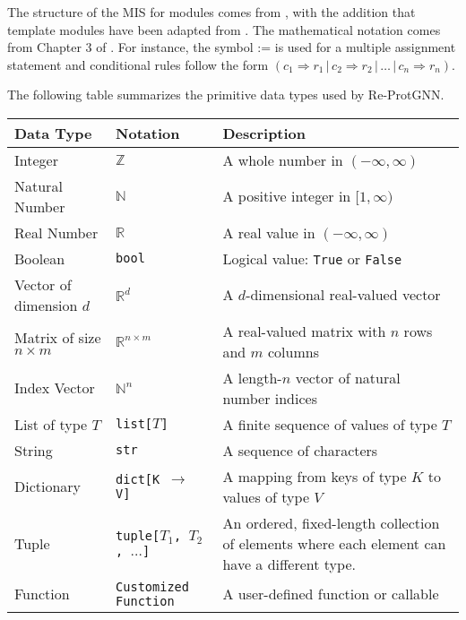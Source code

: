 \documentclass[12pt, titlepage]{article}
\begin{document}
The structure of the MIS for modules comes from \citet{HoffmanAndStrooper1995},
with the addition that template modules have been adapted from
\citet{GhezziEtAl2003}.  The mathematical notation comes from Chapter 3 of
\citet{HoffmanAndStrooper1995}.  For instance, the symbol := is used for a
multiple assignment statement and conditional rules follow the form $(c_1
\Rightarrow r_1 \,|\, c_2 \Rightarrow r_2 \,|\, \dots \,|\, c_n \Rightarrow r_n)$.

\vspace{1em}

The following table summarizes the primitive data types used by Re-ProtGNN. 

\begin{center}
\renewcommand{\arraystretch}{1.2}
\noindent 
\begin{tabular}{l l p{7.5cm}} 
\toprule 
\textbf{Data Type} & \textbf{Notation} & \textbf{Description}\\ 
\midrule
Integer & $\mathbb{Z}$ & A whole number in $(-\infty, \infty)$ \\
Natural Number & $\mathbb{N}$ & A positive integer in $[1, \infty)$ \\
Real Number & $\mathbb{R}$ & A real value in $(-\infty, \infty)$ \\
Boolean & \texttt{bool} & Logical value: \texttt{True} or \texttt{False} \\
Vector of dimension $d$ & $\mathbb{R}^d$ & A $d$-dimensional real-valued vector \\
Matrix of size $n \times m$ & $\mathbb{R}^{n \times m}$ & A real-valued matrix with $n$ rows and $m$ columns \\
Index Vector & $\mathbb{N}^n$ & A length-$n$ vector of natural number indices \\
List of type $T$ & \texttt{list[$T$]} & A finite sequence of values of type $T$ \\
String & \texttt{str} & A sequence of characters \\
Dictionary & \texttt{dict[K $\rightarrow$ V]} & A mapping from keys of type $K$ to values of type $V$ \\
Tuple & \texttt{tuple[$T_1$, $T_2$, $\dots$]} & An ordered, fixed-length collection of elements where each element can have a different type. \\
Function & \texttt{Customized Function} & A user-defined function or callable \\
\bottomrule
\end{tabular} 
\end{center}
\end{document}
